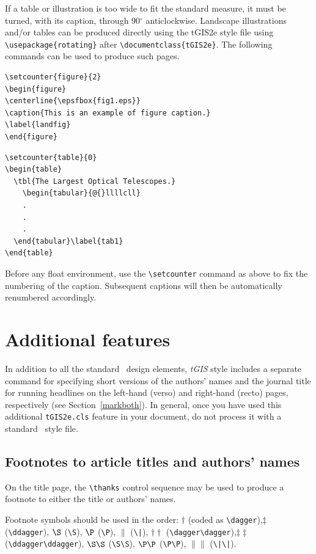 \documentclass[]{tGIS2e}
\begin{document}
If a table or illustration is too wide to fit the standard measure, it must be turned, with its caption, through
90$^{\circ}$ anticlockwise. Landscape illustrations and/or tables can be produced directly using the tGIS2e style
file using \verb"\usepackage{rotating}" after \verb"\documentclass{tGIS2e}". The following commands can be used
to produce such pages.
%
\begin{verbatim}
\setcounter{figure}{2}
\begin{figure}
\centerline{\epsfbox{fig1.eps}}
\caption{This is an example of figure caption.}
\label{landfig}
\end{figure}
\end{verbatim}
%
\begin{verbatim}
\setcounter{table}{0}
\begin{table}
  \tbl{The Largest Optical Telescopes.}
    \begin{tabular}{@{}llllcll}
    .
    .
    .
  \end{tabular}\label{tab1}
\end{table}
\end{verbatim}
%
Before any float environment, use the \verb"\setcounter" command
as above to fix the numbering of the caption. Subsequent captions
will then be automatically renumbered accordingly.


\section{Additional features}

In addition to all the standard \LaTeXe\ design elements, {\it tGIS} style includes a separate command for specifying short versions of the authors' names and the journal title for running headlines on the left-hand (verso) and right-hand (recto) pages, respectively (see Section~\ref{markboth}).  In general, once you have used this additional {\tt tGIS2e.cls} feature in your document, do not process it with a standard \LaTeXe\ style file.

\subsection{Footnotes to article titles and authors' names}

On the title page, the \verb"\thanks" control sequence may be used to produce a footnote to either the title or authors' names.

\vspace{6pt}Footnote symbols should be used in the order: $\dagger$
(coded as \verb"\dagger"),\break $\ddagger$ (\verb"\ddagger"), $\S$ (\verb"\S"),
$\P$ (\verb"\P"), $\|$ (\verb"\|"), $\dagger\dagger$
(\verb"\dagger\dagger"),\break $\ddagger\ddagger$
(\verb"\ddagger\ddagger"),  $\S\S$ (\verb"\S\S"), $\P\P$ (\verb"\P\P"),
$\|\|$ (\verb"\|\|").
\end{document}
